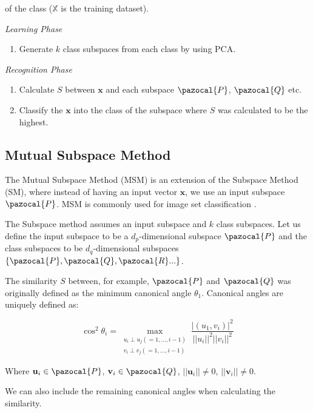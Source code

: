 \noindent of the class ($\mathbb{X}$ is the training dataset).

{\setlength{\parindent}{0cm} \vspace{5mm}

\emph{Learning Phase}

\begin{enumerate}
    \item Generate $k$ class subspaces from each class by using PCA.
\end{enumerate}

\emph{Recognition Phase}

\begin{enumerate}
    \item Calculate $S$ between $\mathbf{x}$ and each subspace $\pazocal{P}$, $\pazocal{Q}$ etc.
    \item Classify the $\mathbf{x}$ into the class of the subspace where $S$ was calculated to be the highest.
\end{enumerate}
}
\newpage

\subsection{Mutual Subspace Method}

The Mutual Subspace Method (MSM) is an extension of the Subspace Method (SM), where instead of having an input vector $\mathbf{x}$, we use an input subspace $\pazocal{P}$. MSM is commonly used for image set classification \cite{sakai2019gait}.

The Subspace method assumes an input subspace and $k$ class subspaces. Let us define the input subspace to be a $d_p$-dimensional subspace $\pazocal{P}$ and the class subspaces to be $d_q$-dimensional subspaces $\{\pazocal{P}, \pazocal{Q}, \pazocal{R}...\}$.

The similarity $S$ between, for example, $\pazocal{P}$ and $\pazocal{Q}$ was originally defined as the minimum canonical angle $\theta_1$. Canonical angles \cite{chatelin2012} are uniquely defined as:

\[    \cos^2 \theta_i = \max_{\substack{u_i \perp u_j(=1,...,i−1) \\ v_i \perp v_j(=1,...,i−1)}} \frac{|(u_1,v_i)|^2}{||u_i||^2||v_i||^2}\]

Where $\mathbf{u}_i \in \pazocal{P}$, $\mathbf{v}_i \in \pazocal{Q}$, $||\mathbf{u}_i|| \neq 0$, $||\mathbf{v}_i|| \neq 0$.

We can also include the remaining canonical angles when calculating the similarity.


